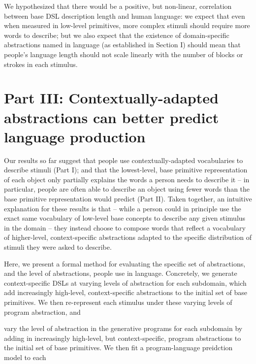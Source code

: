 \documentclass[10pt,letterpaper]{article}
\begin{document}
We hypothesized that there would be a positive, but non-linear, correlation between base DSL description length and human language: we expect that even when measured in low-level primitives, more complex stimuli should require more words to describe; but we also expect that the existence of domain-specific abstractions named in language (as established in Section I) should mean that people's language length should not scale linearly with the number of blocks or strokes in each stimulus.





\section{Part III: Contextually-adapted abstractions can better predict language production}
Our results so far suggest that people use contextually-adapted vocabularies to describe stimuli (Part I); and that the lowest-level, base primitive representation of each object only partially explains the words a person needs to describe it -- in particular, people are often able to describe an object using fewer words than the base primitive representation would predict (Part II). Taken together, an intuitive explanation for these results is that -- while a person could in principle use the exact same vocabulary of low-level base concepts to describe any given stimulus in the domain -- they instead choose to compose words that reflect a vocabulary of higher-level, context-specific abstractions adapted to the specific distribution of stimuli they were asked to describe.

Here, we present a formal method for evaluating the specific set of abstractions, and the level of abstractions, people use in language. Concretely, we generate context-specific DSLs at varying levels of abstraction for each subdomain, which add increasingly high-level, context-specific abstractions to the initial set of base primitives. We then re-represent each stimulus under these varying levels of program abstraction, and 

vary the level of abstraction in the generative programs for each subdomain by adding in increasingly high-level, but context-specific, program abstractions to the initial set of base primitives. We then fit a program-language preidction model to each  
\end{document}
